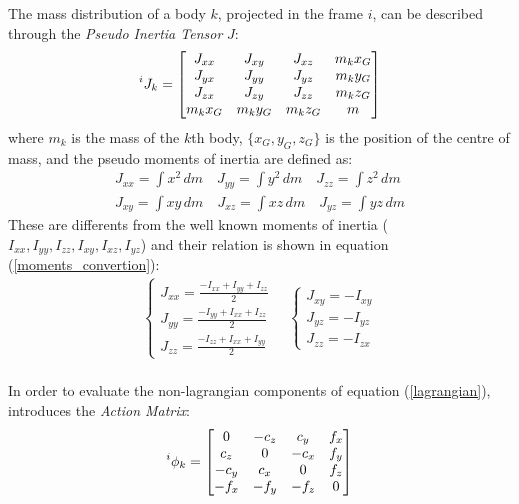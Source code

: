 \documentclass[a4paper,12pt,oneside]{report}
\begin{document}
The mass distribution of a body $k$, projected in the frame $i$, can be described through the \textit{Pseudo Inertia Tensor} $J$:
\begin{equation}
  \prescript{i}{}{J_k}=\begin{bmatrix}
    J_{xx}&J_{xy}&J_{xz}&m_kx_G\\
    J_{yx}&J_{yy}&J_{yz}&m_ky_G\\
    J_{zx}&J_{zy}&J_{zz}&m_kz_G\\
    m_kx_G&m_ky_G&m_kz_G&m
  \end{bmatrix}
\end{equation}
where $m_k$ is the mass of the $k$th body, $\{x_G,y_G,z_G\}$ is the position of the centre of mass, and the pseudo moments of inertia are defined as:
\begin{equation}
  \begin{array}{c}
    J_{xx}=\int x^2\,dm\quad J_{yy}=\int y^2\,dm\quad J_{zz}=\int z^2\,dm\\
    J_{xy}=\int xy\,dm\quad J_{xz}=\int xz\,dm\quad J_{yz}=\int yz\,dm
  \end{array}
  \label{pseudo_moments}
\end{equation}
These are differents from the well known moments of inertia ($I_{xx},I_{yy},I_{zz},I_{xy},I_{xz},I_{yz}$) and their relation is shown in equation (\ref{moments_convertion}):
\begin{equation}
  \begin{array}{c}
    \begin{cases}
      J_{xx}=\frac{-I_{xx}+I_{yy}+I_{zz}}{2}\\
      J_{yy}=\frac{-I_{yy}+I_{xx}+I_{zz}}{2}\\
      J_{zz}=\frac{-I_{zz}+I_{xx}+I_{yy}}{2}
    \end{cases}
    \quad
    \begin{cases}
      J_{xy}=-I_{xy}\\
      J_{yz}=-I_{yz}\\
      J_{zz}=-I_{zx}
    \end{cases}
  \end{array}
\label{moments_convertion}
\end{equation}
\\
In order to evaluate the non-lagrangian components of equation (\ref{lagrangian}), \cite{nine} introduces the \textit{Action Matrix}:
\begin{equation}
  \prescript{i}{}{\phi}_k=\begin{bmatrix}
    0&-c_z&c_y&f_x\\
    c_z&0&-c_x&f_y\\
    -c_y&c_x&0&f_z\\
    -f_x&-f_y&-f_z&0
  \end{bmatrix}
  \label{action_matrix}
\end{equation}
\end{document}
